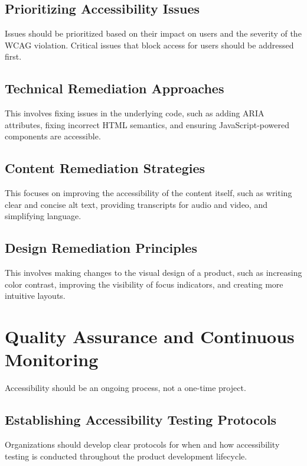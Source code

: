 \subsection{Prioritizing Accessibility Issues}
\label{subsec:prioritizing-issues}
Issues should be prioritized based on their impact on users and the severity of the WCAG violation. Critical issues that block access for users should be addressed first.
\supercite{PowerAccessibility}

\subsection{Technical Remediation Approaches}
\label{subsec:technical-remediation}
This involves fixing issues in the underlying code, such as adding ARIA attributes, fixing incorrect HTML semantics, and ensuring JavaScript-powered components are accessible.
\supercite{ARIA}

\subsection{Content Remediation Strategies}
\label{subsec:content-remediation}
This focuses on improving the accessibility of the content itself, such as writing clear and concise alt text, providing transcripts for audio and video, and simplifying language.
\supercite{WCAGNonText2018}

\subsection{Design Remediation Principles}
\label{subsec:design-remediation}
This involves making changes to the visual design of a product, such as increasing color contrast, improving the visibility of focus indicators, and creating more intuitive layouts.
\supercite{Ware2012}

\section{Quality Assurance and Continuous Monitoring}
\label{sec:qa-monitoring}
Accessibility should be an ongoing process, not a one-time project.

\subsection{Establishing Accessibility Testing Protocols}
\label{subsec:testing-protocols}
Organizations should develop clear protocols for when and how accessibility testing is conducted throughout the product development lifecycle.

